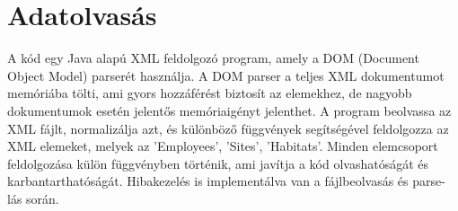 \documentclass[12pt]{report}
\begin{document}
\section{Adatolvasás}
\indent\indent A kód egy Java alapú XML feldolgozó program, amely a DOM (Document Object Model) parserét használja. A DOM parser a teljes XML dokumentumot memóriába tölti, ami gyors hozzáférést biztosít az elemekhez, de nagyobb dokumentumok esetén jelentős memóriaigényt jelenthet. A program beolvassa az XML fájlt, normalizálja azt, és különböző függvények segítségével feldolgozza az XML elemeket, melyek az 'Employees', 'Sites', 'Habitats'. Minden elemcsoport feldolgozása külön függvényben történik, ami javítja a kód olvashatóságát és karbantarthatóságát. Hibakezelés is implementálva van a fájlbeolvasás és parse-lás során.\\
\end{document}
